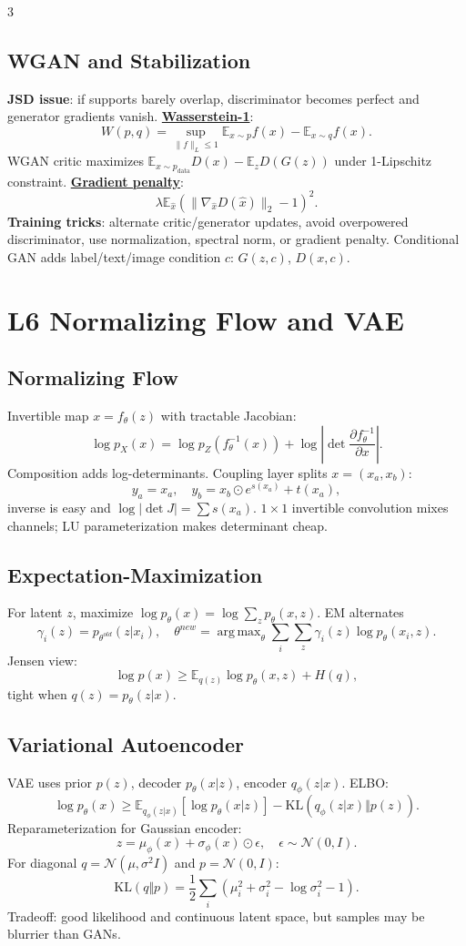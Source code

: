 \documentclass{article}
\newcommand{\key}[1]{\textbf{#1}}
\newcommand{\lowterm}[1]{\textbf{\underline{#1}}}
\newcommand{\E}{\mathbb{E}}
\newcommand{\N}{\mathcal{N}}
\newcommand{\KL}{\mathrm{KL}}
\DeclareMathOperator*{\argmax}{arg\,max}
\begin{document}
\begin{multicols*}{3}
\subsection{WGAN and Stabilization}
\key{JSD issue}: if supports barely overlap, discriminator becomes perfect and generator gradients vanish. \lowterm{Wasserstein-1}:
\[
W(p,q)=\sup_{\|f\|_L\le1}\E_{x\sim p}f(x)-\E_{x\sim q}f(x).
\]
WGAN critic maximizes $\E_{x\sim p_{\text{data}}}D(x)-\E_zD(G(z))$ under 1-Lipschitz constraint. \lowterm{Gradient penalty}:
\[
\lambda\E_{\hat x}\left(\|\nabla_{\hat x}D(\hat x)\|_2-1\right)^2.
\]
\key{Training tricks}: alternate critic/generator updates, avoid overpowered discriminator, use normalization, spectral norm, or gradient penalty. Conditional GAN adds label/text/image condition $c$: $G(z,c)$, $D(x,c)$.

\section{L6 Normalizing Flow and VAE}
\subsection{Normalizing Flow}
Invertible map $x=f_\theta(z)$ with tractable Jacobian:
\[
\log p_X(x)=\log p_Z(f_\theta^{-1}(x))+\log\left|\det\frac{\partial f_\theta^{-1}}{\partial x}\right|.
\]
Composition adds log-determinants. Coupling layer splits $x=(x_a,x_b)$:
\[
y_a=x_a,\quad y_b=x_b\odot e^{s(x_a)}+t(x_a),
\]
inverse is easy and $\log|\det J|=\sum s(x_a)$. $1\times1$ invertible convolution mixes channels; LU parameterization makes determinant cheap.

\subsection{Expectation-Maximization}
For latent $z$, maximize $\log p_\theta(x)=\log\sum_z p_\theta(x,z)$. EM alternates
\[
\gamma_i(z)=p_{\theta^{old}}(z|x_i),\quad
\theta^{new}=\argmax_\theta\sum_i\sum_z\gamma_i(z)\log p_\theta(x_i,z).
\]
Jensen view:
\[
\log p(x)\ge \E_{q(z)}\log p_\theta(x,z)+H(q),
\]
tight when $q(z)=p_\theta(z|x)$.

\subsection{Variational Autoencoder}
VAE uses prior $p(z)$, decoder $p_\theta(x|z)$, encoder $q_\phi(z|x)$. ELBO:
\[
\log p_\theta(x)\ge
\E_{q_\phi(z|x)}[\log p_\theta(x|z)]-\KL(q_\phi(z|x)\Vert p(z)).
\]
Reparameterization for Gaussian encoder:
\[
z=\mu_\phi(x)+\sigma_\phi(x)\odot\epsilon,\quad \epsilon\sim\N(0,I).
\]
For diagonal $q=\N(\mu,\sigma^2I)$ and $p=\N(0,I)$:
\[
\KL(q\Vert p)=\frac12\sum_i(\mu_i^2+\sigma_i^2-\log\sigma_i^2-1).
\]
Tradeoff: good likelihood and continuous latent space, but samples may be blurrier than GANs.


\end{multicols*}
\end{document}
